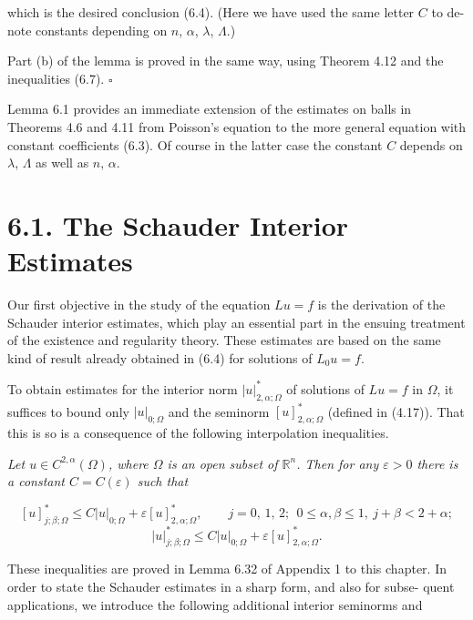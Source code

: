 which is the desired conclusion (6.4). (Here we have used the same letter $C$ to de-
note constants depending on $n$, $\alpha$, $\lambda$, $\Lambda$.)

Part (b) of the lemma is proved in the same way, using Theorem 4.12 and the
inequalities (6.7). $\square$

Lemma 6.1 provides an immediate extension of the estimates on balls in
Theorems 4.6 and 4.11 from Poisson's equation to the more general equation with
constant coefficients (6.3). Of course in the latter case the constant $C$ depends on
$\lambda$, $\Lambda$ as well as $n$, $\alpha$.

\section*{6.1. The Schauder Interior Estimates}

Our first objective in the study of the equation $Lu=f$ is the derivation of the Schauder
interior estimates, which play an essential part in the ensuing treatment of the
existence and regularity theory. These estimates are based on the same kind of
result already obtained in (6.4) for solutions of $L_0u=f$.

To obtain estimates for the interior norm $\lvert u\rvert^{*}_{2,\alpha;\Omega}$ of solutions of $Lu=f$ in $\Omega$,
it suffices to bound only $\lvert u\rvert_{0;\Omega}$ and the seminorm $[u]^{*}_{2,\alpha;\Omega}$ (defined in (4.17)). That
this is so is a consequence of the following interpolation inequalities.

\emph{Let $u\in C^{2,\alpha}(\Omega)$, where $\Omega$ is an open subset of $\mathbb{R}^n$. Then for any $\varepsilon>0$ there is a
constant $C=C(\varepsilon)$ such that}

\begin{equation}\tag{6.8}
[u]^{*}_{j;\beta;\Omega}\leq C\lvert u\rvert_{0;\Omega}+\varepsilon [u]^{*}_{2,\alpha;\Omega},
\qquad j=0,\,1,\,2;\ \ 0\leq \alpha,\beta\leq 1,\ j+\beta<2+\alpha;
\end{equation}
\begin{equation}\tag{6.9}
\lvert u\rvert^{*}_{j;\beta;\Omega}\leq C\lvert u\rvert_{0;\Omega}+\varepsilon [u]^{*}_{2,\alpha;\Omega}.
\end{equation}

These inequalities are proved in Lemma 6.32 of Appendix 1 to this chapter.
In order to state the Schauder estimates in a sharp form, and also for subse-
quent applications, we introduce the following additional interior seminorms and

